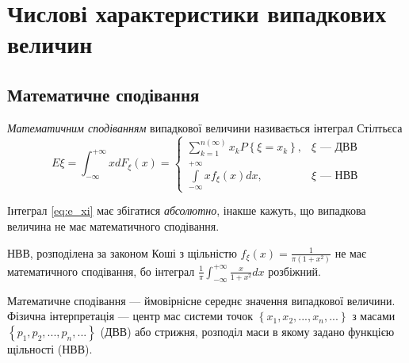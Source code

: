 \section{Числові характеристики випадкових величин}
\subsection{Математичне сподівання}

\begin{definition}
    \emph{Математичним сподіванням} випадкової величини називається
    інтеграл Стілтьєса
    \begin{equation}\label{eq:e_xi}
        E\xi = \int_{-\infty}^{+\infty} x dF_\xi(x) = \begin{cases}
            \sum\limits_{k=1}^{n(\infty)} x_k P\left\{\xi = x_k\right\}, & \xi \text{ --- ДВВ} \\
            \int\limits_{-\infty}^{+\infty} x f_\xi(x)dx, & \xi \text{ --- НВВ}
        \end{cases}
    \end{equation}
\end{definition}
Інтеграл \eqref{eq:e_xi} має збігатися \emph{абсолютно}, інакше кажуть, що
випадкова величина не має математичного сподівання.
\begin{example}
    НВВ, розподілена за законом Коші з щільністю $f_\xi(x) = \frac{1}{\pi (1+x^2)}$
    не має математичного сподівання, бо інтеграл $\frac{1}{\pi}\int_{-\infty}^{+\infty} \frac{x}{1+x^2}dx$ 
    розбіжний.
\end{example}
Математичне сподівання --- ймовірнісне середнє значення випадкової величини.
Фізична інтерпретація --- центр мас системи точок $\left\{x_1, x_2, ..., x_n,...\right\}$ з масами $\left\{p_1, p_2, ..., p_n, ...\right\}$ (ДВВ) або стрижня,
розподіл маси в якому задано функцією щільності (НВВ).

